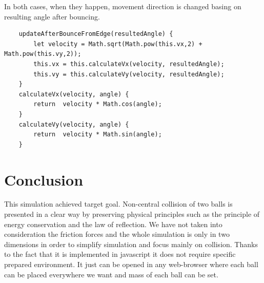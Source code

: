 \documentclass[]{report}
\begin{document}
In both cases, when they happen, movement direction is changed basing on resulting angle after bouncing.

\begin{lstlisting}
    updateAfterBounceFromEdge(resultedAngle) {
        let velocity = Math.sqrt(Math.pow(this.vx,2) + Math.pow(this.vy,2));
        this.vx = this.calculateVx(velocity, resultedAngle);
        this.vy = this.calculateVy(velocity, resultedAngle);
    }
    calculateVx(velocity, angle) {
        return  velocity * Math.cos(angle);
    }
    calculateVy(velocity, angle) {
        return  velocity * Math.sin(angle);
    }

\end{lstlisting}
\section{Conclusion}
This simulation achieved target goal. Non-central collision of two balls is presented in a clear way by preserving physical principles such as the principle of energy conservation and the law of reflection. We have not taken into consideration the friction forces and the whole simulation is only in two dimensions in order to simplify simulation and focus mainly on collision. Thanks to the fact that it is implemented in javascript it does not require specific prepared environment. It just can be opened in any web-browser where each ball can be placed everywhere we want and mass of each ball can be set. 
\end{document}

